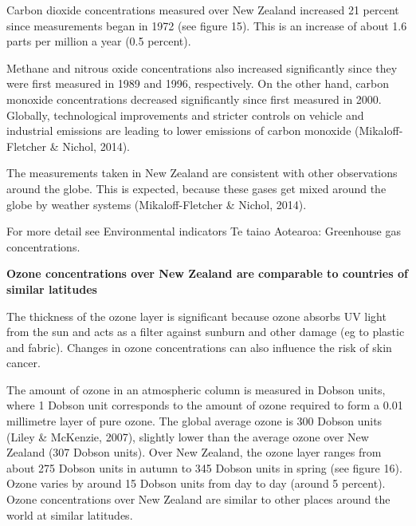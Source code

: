 \documentclass[11pt]{article} %
\begin{document}
Carbon dioxide concentrations measured over New Zealand increased 21 percent since measurements began in 1972 (see figure 15). This is an increase of about 1.6 parts per million a year (0.5 percent).


Methane and nitrous oxide concentrations also increased significantly since they were first measured in 1989 and 1996, respectively. On the other hand, carbon monoxide concentrations decreased significantly since first measured in 2000. Globally, technological improvements and stricter controls on vehicle and industrial emissions are leading to lower emissions of carbon monoxide (Mikaloff-Fletcher \& Nichol, 2014).

The measurements taken in New Zealand are consistent with other observations around the globe. This is expected, because these gases get mixed around the globe by weather systems (Mikaloff-Fletcher \& Nichol, 2014).

For more detail see Environmental indicators Te taiao Aotearoa: Greenhouse gas concentrations.

\textbf{Ozone concentrations over New Zealand are comparable to countries of similar latitudes}

The thickness of the ozone layer is significant because ozone absorbs UV light from the sun and acts as a filter against sunburn and other damage (eg to plastic and fabric). Changes in ozone concentrations can also influence the risk of skin cancer.

The amount of ozone in an atmospheric column is measured in Dobson units, where 1 Dobson unit corresponds to the amount of ozone required to form a 0.01 millimetre layer of pure ozone. The global average ozone is 300 Dobson units (Liley \& McKenzie, 2007), slightly lower than the average ozone over New Zealand (307 Dobson units). Over New Zealand, the ozone layer ranges from about 275 Dobson units in autumn to 345 Dobson units in spring (see figure 16). Ozone varies by around 15 Dobson units from day to day (around 5 percent). Ozone concentrations over New Zealand are similar to other places around the world at similar latitudes.
\end{document}
